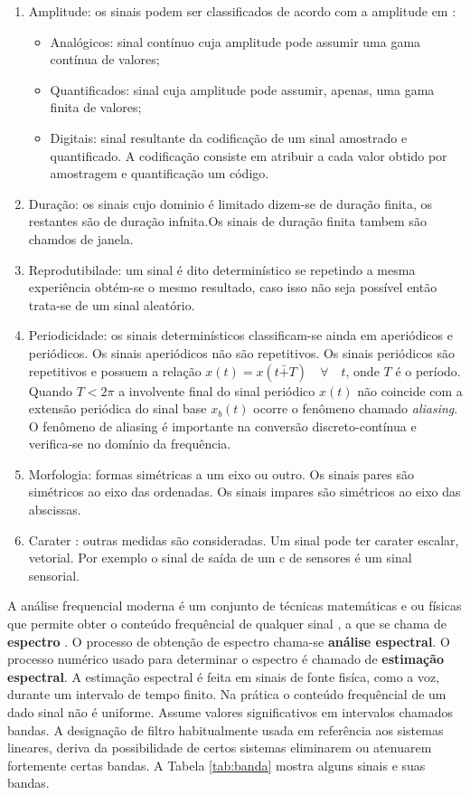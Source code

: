 \begin{enumerate}
\item Amplitude: os sinais podem ser classificados de acordo com a amplitude em :
\begin{itemize}
\item Analógicos: sinal contínuo cuja amplitude pode assumir uma gama contínua de valores;
\item Quantificados: sinal cuja amplitude pode assumir, apenas, uma gama finita de valores;
\item Digitais: sinal resultante da codificação de um sinal amostrado e quantificado. A codificação consiste em atribuir a cada valor obtido por amostragem e quantificação  um código.
\end{itemize} 
\item Duração: os sinais cujo dominio é limitado dizem-se de duração finita, os restantes são de duração infnita.Os sinais de duração finita tambem são chamdos de janela.
\item Reprodutibilade: um sinal é dito determinístico se repetindo a mesma experiência obtém-se o mesmo resultado, caso isso não seja possível  então trata-se de um sinal aleatório.
\item Periodicidade: os sinais determinísticos classificam-se ainda em aperiódicos e periódicos. Os sinais aperiódicos não são repetitivos. Os sinais periódicos são repetitivos e possuem a relação $x(t) = x(t \bar{+} T) \quad \forall \quad t$, onde $T$ é o período. Quando $T < 2 \pi$ a involvente final do sinal periódico $x(t)$ não coincide com a extensão periódica do sinal base $x_b(t)$ ocorre o fenômeno chamado \textit{aliasing}. O fenômeno de aliasing é importante na conversão discreto-contínua e verifica-se no domínio da frequência.
\item Morfologia: formas simétricas a um eixo ou outro. Os sinais pares são simétricos ao eixo das ordenadas. Os sinais impares são simétricos ao eixo das abscissas.
\item Carater : outras medidas são consideradas. Um sinal pode ter carater escalar, vetorial. Por exemplo o sinal de saída de um c de sensores é um sinal sensorial.
\end{enumerate}

A análise frequencial moderna é um conjunto de técnicas matemáticas e ou físicas que permite  obter o conteúdo frequêncial de qualquer sinal , a que se chama de \textbf {espectro} . O processo de obtenção de espectro chama-se \textbf {análise espectral}. O processo numérico usado para determinar o espectro é chamado de  \textbf {estimação espectral}. A estimação espectral é feita em sinais de fonte fisíca, como a voz, durante um intervalo de tempo finito. Na prática o conteúdo frequêncial de um dado sinal não é uniforme. Assume valores significativos em intervalos chamados bandas. A designação de filtro habitualmente usada em referência aos sistemas lineares, deriva da possibilidade de certos sistemas eliminarem ou atenuarem fortemente certas bandas. A Tabela \ref{tab:banda}
mostra alguns sinais e suas bandas.

